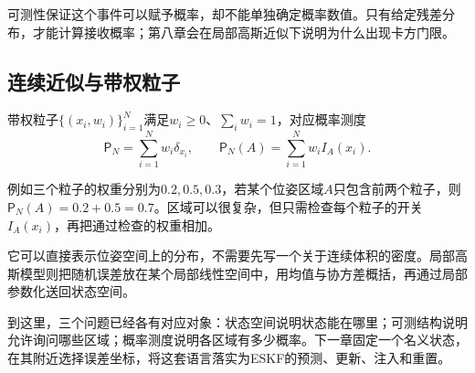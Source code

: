 可测性保证这个事件可以赋予概率，却不能单独确定概率数值。只有给定残差分布，才能计算接收概率；第八章会在局部高斯近似下说明为什么出现卡方门限。

\subsection{连续近似与带权粒子}

带权粒子$\{(x_i,w_i)\}_{i=1}^N$满足$w_i\geq0$、$\sum_iw_i=1$，对应概率测度
\[
 \mathsf P_N=\sum_{i=1}^Nw_i\delta_{x_i},\qquad
 \mathsf P_N(A)=\sum_{i=1}^Nw_iI_A(x_i).
\]

例如三个粒子的权重分别为$0.2,0.5,0.3$，若某个位姿区域$A$只包含前两个粒子，则$\mathsf P_N(A)=0.2+0.5=0.7$。区域可以很复杂，但只需检查每个粒子的开关$I_A(x_i)$，再把通过检查的权重相加。

它可以直接表示位姿空间上的分布，不需要先写一个关于连续体积的密度。局部高斯模型则把随机误差放在某个局部线性空间中，用均值与协方差概括，再通过局部参数化送回状态空间。

到这里，三个问题已经各有对应对象：状态空间说明状态能在哪里；可测结构说明允许询问哪些区域；概率测度说明各区域有多少概率。下一章固定一个名义状态，在其附近选择误差坐标，将这套语言落实为ESKF的预测、更新、注入和重置。
